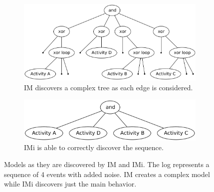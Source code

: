 \documentclass[
	a4paper,
	pagesize,
	pdftex,
	12pt,
	twoside, %
	BCOR=5mm, %
	ngerman,
	fleqn,
	final,
	]{scrartcl}
\begin{document}
\begin{figure}[h]
	\begin{subfigure}[t]{.9\textwidth}
	  \centering
	  \includegraphics[width=0.5\linewidth]{img/noise.png}
	  \caption{IM discovers a complex tree as each edge is considered.}
	\end{subfigure}
	\begin{subfigure}[t]{.9\textwidth}
	  \centering
	  	  \includegraphics[width=0.45\linewidth]{img/noiseless.png}
	  \caption{IMi is able to correctly discover the sequence.}
	\end{subfigure}
\caption{Models as they are discovered by IM and IMi. The log represents a sequence of 4 events with added noise. IM creates a complex model while IMi discovers just the main behavior.}
\label{fig:IMvsIMi}
\end{figure}
\end{document}

